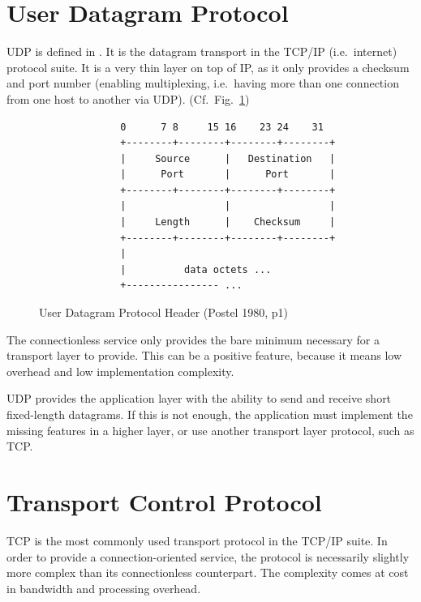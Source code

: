 \documentclass[10pt]{report}
\begin{document}
\section{User Datagram Protocol}

UDP is defined in \cite{rfc768}.  It is the datagram transport in the
TCP/IP (i.e.\ internet) protocol suite.  It is a very thin layer on top
of IP, as it only provides a checksum and port number (enabling
multiplexing, i.e.\ having more than one connection from one host to
another via UDP). (Cf.\ Fig.\ \ref{udpheader}) \cite{rfc1180}

\begin{figure}[h]
    \label{udpheader}
    \centering
	\begin{verbatim}
              0      7 8     15 16    23 24    31  
              +--------+--------+--------+--------+
              |     Source      |   Destination   |
              |      Port       |      Port       |
              +--------+--------+--------+--------+
              |                 |                 |
              |     Length      |    Checksum     |
              +--------+--------+--------+--------+
              |                                    
              |          data octets ...           
              +---------------- ...                
	\end{verbatim}
    \caption{User Datagram Protocol Header
	    (Postel 1980, p1) %
    }
\end{figure}

The connectionless service only provides the bare minimum necessary for
a transport layer to provide.  This can be a positive feature, because
it means low overhead and low implementation complexity.

UDP provides the application layer with the ability to send and receive
short fixed-length datagrams.  If this is not enough, the application
must implement the missing features in a higher layer, or use another
transport layer protocol, such as TCP.

\section{Transport Control Protocol}

TCP \cite{rfc793} is the most commonly used transport protocol in the
TCP/IP suite.  In order to provide a connection-oriented service, the
protocol is necessarily slightly more complex than its connectionless
counterpart.  The complexity comes at cost in bandwidth and processing
overhead.
\end{document}
